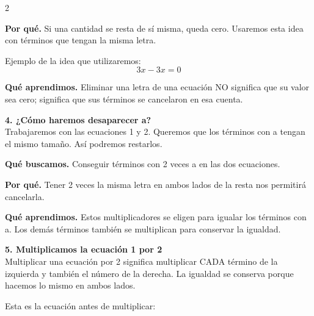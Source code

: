 \documentclass[11pt,a4paper,landscape]{article}
\begin{document}
\begin{multicols*}{2}
\begin{minipage}{\linewidth}
\par\smallskip\textbf{Por qué.} Si una cantidad se resta de sí misma, queda cero. Usaremos esta idea con términos que tengan la misma letra.
\par\smallskip Ejemplo de la idea que utilizaremos:
\[3x-3x=0\]
\par\smallskip\textbf{Qué aprendimos.} Eliminar una letra de una ecuación NO significa que su valor sea cero; significa que sus términos se cancelaron en esa cuenta.
\end{minipage}\par\medskip
\noindent\begin{minipage}{\linewidth}\textbf{4. ¿Cómo haremos desaparecer a?}\\[2pt]Trabajaremos con las ecuaciones 1 y 2. Queremos que los términos con a tengan el mismo tamaño. Así podremos restarlos.
\par\smallskip\textbf{Qué buscamos.} Conseguir términos con 2 veces a en las dos ecuaciones.
\par\smallskip\textbf{Por qué.} Tener 2 veces la misma letra en ambos lados de la resta nos permitirá cancelarla.
\par{}\par\smallskip
\par\smallskip\textbf{Qué aprendimos.} Estos multiplicadores se eligen para igualar los términos con a. Los demás términos también se multiplican para conservar la igualdad.
\end{minipage}\par\medskip
\noindent\begin{minipage}{\linewidth}\textbf{5. Multiplicamos la ecuación 1 por 2}\\[2pt]Multiplicar una ecuación por 2 significa multiplicar CADA término de la izquierda y también el número de la derecha. La igualdad se conserva porque hacemos lo mismo en ambos lados.
\par\smallskip Esta es la ecuación antes de multiplicar:

\end{minipage}
\end{multicols*}
\end{document}
